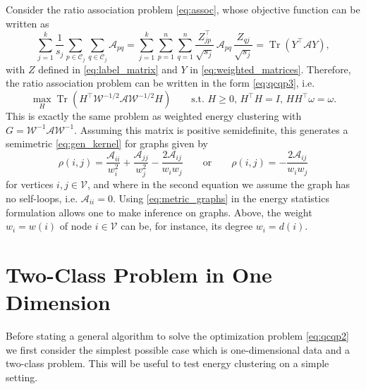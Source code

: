 \documentclass[aps,preprint,nofootinbib,floatfix]{revtex4-1}
\DeclareMathOperator{\Tr}{Tr}
\newcommand\C{{\mathcal{C}}}
\newcommand\om{\omega}
\begin{document}
Consider the ratio association problem \eqref{eq:assoc}, 
whose objective function can be written as
\begin{equation}
\sum_{j=1}^k \dfrac{1}{s_j} \sum_{p \in \C_j} \sum_{q \in \C_j}
\mathcal{A}_{pq} = \sum_{j=1}^k \sum_{p=1}^n \sum_{q=1}^n 
\dfrac{Z^\top_{jp}}{\sqrt{s_j}} \, \mathcal{A}_{pq} \, 
\dfrac{Z_{qj}}{\sqrt{s_j}}
= \Tr\left( Y^\top \mathcal{A} Y \right) ,
\end{equation}
with $Z$ defined in \eqref{eq:label_matrix} and $Y$ in
\eqref{eq:weighted_matrices}. Therefore, the ratio association problem
can be written in the form \eqref{eq:qcqp3}, i.e.
\begin{equation}
\max_H \Tr\left( H^\top \mathcal{W}^{-1/2} \mathcal{A} \mathcal{W}^{-1/2} H 
\right) \qquad \mbox{s.t. $H\ge 0$, $H^\top H = I$, $H H^\top
\om=\om$}.
\end{equation}
This is exactly the same problem as weighted energy 
clustering with 
$G = \mathcal{W}^{-1} \mathcal{A} \mathcal{W}^{-1}$. Assuming this
matrix is positive semidefinite, this generates a semimetric
\eqref{eq:gen_kernel} for graphs given by
\begin{equation}
\label{eq:metric_graphs}
\rho(i,j) = 
\dfrac{\mathcal{A}_{ii}}{w_i^{2}}
+\dfrac{\mathcal{A}_{jj}}{w_j^{2}}
-\dfrac{2 \mathcal{A}_{ij}}{w_i w_j} \qquad\mbox{or}\qquad
\rho(i,j) = -\dfrac{2 \mathcal{A}_{ij}}{w_i w_j}
\end{equation}
for vertices $i,j \in \mathcal{V}$, and 
where in the second equation we assume the graph has no self-loops,
i.e. $\mathcal{A}_{ii} = 0$. 
Using \eqref{eq:metric_graphs} 
in the energy statistics formulation 
allows one to make inference
on graphs.
Above, the weight $w_i = w(i)$ of node $i\in \mathcal{V}$ can be, for instance,
its degree $w_i = d(i)$.


\section{Two-Class Problem in One Dimension}
\label{sec:twoclass}

Before stating a general algorithm to solve the optimization problem
\eqref{eq:qcqp2}
we first consider the simplest possible case which
is one-dimensional data and a two-class problem. This will be useful to test
energy clustering on a simple setting.
\end{document}
